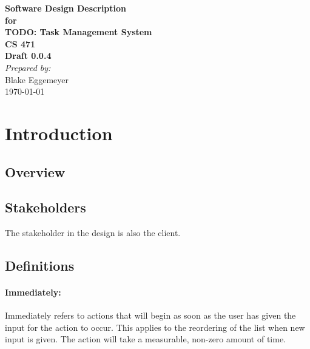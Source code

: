 \documentclass[12pt]{article}
\begin{document}
\begin{titlepage}
\begin{flushright} 
{\LARGE \bfseries Software Design Description}\\[1.2cm]
{\large \bfseries for}\\[1.2cm]
{\huge \bfseries TODO: Task Management System}\\[1.2cm]
{\large \bfseries CS 471}\\
\vfill
{\large \bfseries Draft 0.0.4}\\[2cm]
\emph{Prepared by:} \\
Blake Eggemeyer \\ [3cm]
{\large \today}
\end{flushright}
\end{titlepage}
\setcounter{tocdepth}{3}
\setcounter{secnumdepth}{5}
\tableofcontents
\newpage

\section{Introduction}

\subsection{Overview}

\subsection{Stakeholders}
The stakeholder in the design is also the client.

\subsection{}

\subsection{Definitions}
\setcounter{paragraph}{0}
\setcounter{subsubsection}{0}
\paragraph{Immediately:} Immediately refers to actions that will begin as soon as the user has given the input for the action to occur.  This applies to the reordering of the list when new input is given.  The action will take a measurable, non-zero amount of time.
\end{document}
